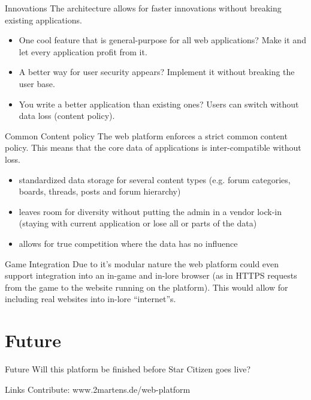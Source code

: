 \documentclass{beamer}
\begin{document}
	\begin{frame}{Innovations}
		The architecture allows for faster innovations without breaking existing applications.
		\begin{itemize}
			\item One cool feature that is general-purpose for all web applications? Make it and let every application profit from it.
			\item A better way for user security appears? Implement it without breaking the user base.
			\item You write a better application than existing ones? Users can switch without data loss (content policy).
		\end{itemize}
	\end{frame}
	\begin{frame}{Common Content policy}
		The web platform enforces a strict common content policy. This means that the core data of applications is inter-compatible without loss.
		
		\begin{itemize}
			\item standardized data storage for several content types (e.g. forum categories, boards, threads, posts and forum hierarchy)
			\item leaves room for diversity without putting the admin in a vendor lock-in (staying with current application or lose all or parts of the data)
			\item allows for true competition where the data has no influence
		\end{itemize}
	\end{frame}
	\begin{frame}{Game Integration}
		Due to it's modular nature the web platform could even support integration into an in-game and in-lore browser (as in HTTPS requests from the game to the website running on the platform). This would allow for including real websites into in-lore ``internet''s.
	\end{frame}
	
	\section{Future}
	\begin{frame}{Future}
		\centering Will this platform be finished before Star Citizen goes live?
	\end{frame}
	
	\begin{frame}{Links}
		\centering Contribute: www.2martens.de/web-platform
	\end{frame}
\end{document}
